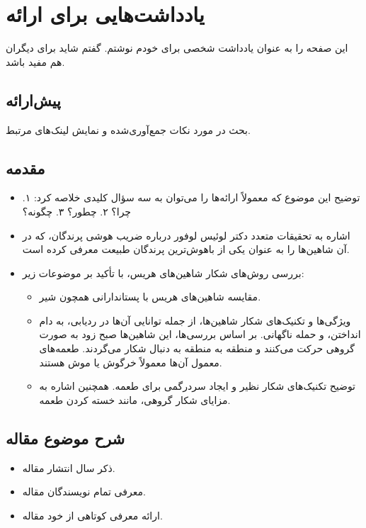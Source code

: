 \documentclass[12pt]{article}
\begin{document}
\section*{یادداشت‌هایی برای ارائه}
این صفحه را به عنوان یادداشت شخصی برای خودم نوشتم. گفتم شاید برای دیگران هم مفید باشد.

\subsection*{پیش‌ارائه}
بحث در مورد نکات جمع‌آوری‌شده و نمایش لینک‌های مرتبط.

\subsection*{مقدمه}
\begin{itemize}
    \item توضیح این موضوع که معمولاً ارائه‌ها را می‌توان به سه سؤال کلیدی خلاصه کرد: 
    ۱. چرا؟ 
    ۲. چطور؟ 
    ۳. چگونه؟
    
    \item اشاره به تحقیقات متعدد دکتر لوئیس لوفور درباره ضریب هوشی پرندگان، که در آن شاهین‌ها را به عنوان یکی از باهوش‌ترین پرندگان طبیعت معرفی کرده است.
    
    \item بررسی روش‌های شکار شاهین‌های هریس، با تأکید بر موضوعات زیر:
    \begin{itemize}
        \item مقایسه شاهین‌های هریس با پستاندارانی همچون شیر.
        \item ویژگی‌ها و تکنیک‌های شکار شاهین‌ها، از جمله توانایی آن‌ها در ردیابی، به دام انداختن، و حمله ناگهانی. بر اساس بررسی‌ها، این شاهین‌ها صبح زود به صورت گروهی حرکت می‌کنند و منطقه به منطقه به دنبال شکار می‌گردند. طعمه‌های معمول آن‌ها معمولاً خرگوش یا موش هستند.
        \item توضیح تکنیک‌های شکار نظیر  و ایجاد سردرگمی برای طعمه. همچنین اشاره به مزایای شکار گروهی، مانند خسته کردن طعمه.
    \end{itemize}
\end{itemize}
\subsection*{شرح موضوع مقاله}
\begin{itemize}
    \item ذکر سال انتشار مقاله.
    \item معرفی تمام نویسندگان مقاله.
    \item ارائه معرفی کوتاهی از خود مقاله.
\end{itemize}
\end{document}
